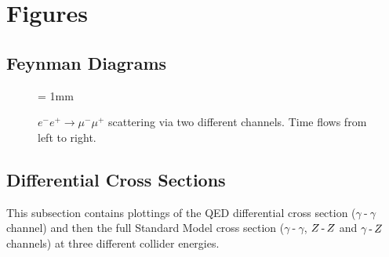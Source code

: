 \documentclass[]{article}
\begin{document}
\section{Figures}

\subsection{Feynman Diagrams}

\begin{figure}[H]
	\vspace{10pt}
	\unitlength = 1mm
	\centering
	\qquad
	\caption{$e^{-}e^{+}\to\mu^{-}\mu^{+}$ scattering via two different channels. Time flows from left to right.}
\end{figure}

\subsection{Differential Cross Sections}\label{ssec:differentialfigs}

This subsection contains plottings of the QED differential cross section ($\gamma\operatorname{-}\gamma$ channel) and then the full Standard Model cross section ($\gamma\operatorname{-}\gamma$, $Z \operatorname{-}Z $ and $\gamma\operatorname{-}Z $ channels) at three different collider energies.
\end{document}
